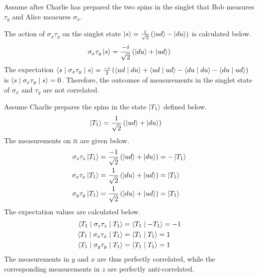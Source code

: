 \begin{answer}
	Assume after Charlie has prepared the two spins in the singlet that Bob measures $\tau_y$ and Alice measures $\sigma_x$.

	The action of $\sigma_x \tau_y$ on the singlet state $\ket{s} = \frac{1}{\sqrt{2}} \left(\ket{u d} - \ket{d u}\right)$ is calculated below.
	\begin{align}
		\sigma_x \tau_y \ket{s} = \frac{-i}{\sqrt{2}} \left(\ket{d u} + \ket{u d}\right)
	\end{align}
	The expectation $\braket{s \mid \sigma_x \tau_y \mid s} = \frac{-i}{2} \left(\braket{u d \mid d u} + \braket{u d \mid u d} - \braket{d u \mid d u} - \braket{d u \mid u d}\right)$ is $\braket{s \mid \sigma_x \tau_y \mid s} = 0$.
	Therefore, the outcomes of measurements in the singlet state of $\sigma_x$ and $\tau_y$ are not correlated.
\end{answer}

\begin{answer}
	Assume Charlie prepares the spins in the state $\ket{T_1}$ defined below.
	\begin{align}
		\ket{T_1} & = \frac{1}{\sqrt{2}} \left(\ket{u d} + \ket{d u}\right)
	\end{align}
	The measurements on it are given below.
	\begin{align*}
		\sigma_z \tau_z \ket{T_1} & = \frac{-1}{\sqrt{2}} \left(\ket{u d} + \ket{d u}\right) = - \ket{T_1} \\
		\sigma_x \tau_x \ket{T_1} & = \frac{1}{\sqrt{2}} \left(\ket{d u} + \ket{u d}\right) = \ket{T_1}    \\
		\sigma_y \tau_y \ket{T_1} & = \frac{1}{\sqrt{2}} \left(\ket{d u} + \ket{u d}\right) = \ket{T_1}
	\end{align*}
	The expectation values are calculated below.
	\begin{align*}
		\braket{T_1 \mid \sigma_z \tau_z \mid T_1} & = \braket{T_1 \mid -T_1} = -1 \\
		\braket{T_1 \mid \sigma_x \tau_x \mid T_1} & = \braket{T_1 \mid T_1} = 1   \\
		\braket{T_1 \mid \sigma_y \tau_y \mid T_1} & = \braket{T_1 \mid T_1} = 1
	\end{align*}
	The measurements in $y$ and $x$ are thus perfectly correlated, while the corresponding measurements in $z$ are perfectly anti-correlated.
\end{answer}

